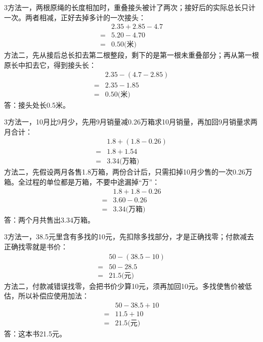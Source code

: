 \documentclass[multi=snippet,border={5bp 20bp 5bp 5bp}]{standalone}
\newenvironment{snippet}[3]{\begin{minipage}{#1bp}\color{answerred}\fontsize{#2}{#3}\selectfont\raggedright}{\end{minipage}}
\begin{document}
\begin{snippet}{505}{11.5}{14}\begin{multicols}{3}\raggedcolumns 方法一，两根原绳的长度相加时，重叠接头被计了两次；接好后的实际总长只计一次。两者相减，正好去掉多计的一次接头：\[\begin{aligned}&2.35+2.85-4.7\\={}&5.20-4.70\\={}&0.50\text{(米)}\end{aligned}\]方法二，先从接后总长扣去第二根整段，剩下的是第一根未重叠部分；再从第一根原长中扣去它，得到接头长：\[\begin{aligned}&2.35-(4.7-2.85)\\={}&2.35-1.85\\={}&0.50\text{(米)}\end{aligned}\]答：接头处长0.5米。\end{multicols}\end{snippet}
\begin{snippet}{505}{11.5}{14}\begin{multicols}{3}\raggedcolumns 方法一，10月比9月少，先用9月销量减0.26万箱求10月销量，再加回9月销量求两月合计：\[\begin{aligned}&1.8+(1.8-0.26)\\={}&1.8+1.54\\={}&3.34\text{(万箱)}\end{aligned}\]方法二，先假设两月各售1.8万箱，两份合计后，只需扣掉10月少售的一次0.26万箱。全过程的单位都是万箱，不要中途漏掉“万”：\[\begin{aligned}&1.8+1.8-0.26\\={}&3.60-0.26\\={}&3.34\text{(万箱)}\end{aligned}\]答：两个月共售出3.34万箱。\end{multicols}\end{snippet}
\begin{snippet}{505}{11.5}{14}\begin{multicols}{3}\raggedcolumns 方法一，38.5元里含有多找的10元，先扣除多找部分，才是正确找零；付款减去正确找零就是书价：\[\begin{aligned}&50-(38.5-10)\\={}&50-28.5\\={}&21.5\text{(元)}\end{aligned}\]方法二，付款减错误找零，会把书价少算10元，须再加回10元。多找使售价被低估，所以补偿应使用加法：\[\begin{aligned}&50-38.5+10\\={}&11.5+10\\={}&21.5\text{(元)}\end{aligned}\]答：这本书21.5元。\end{multicols}\end{snippet}
\end{document}
